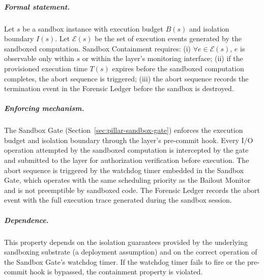 
\subparagraph{Formal statement.}  Let $s$ be a sandbox instance with execution
budget $B(s)$ and isolation boundary $I(s)$.  Let $\mathcal{E}(s)$ be the set of
execution events generated by the sandboxed computation.  Sandbox Containment
requires: (i) $\forall e \in \mathcal{E}(s)$, $e$ is observable only within $s$
or within the \fact{} layer's monitoring interface; (ii) if the provisioned
execution time $T(s)$ expires before the sandboxed computation completes, the
abort sequence is triggered; (iii) the abort sequence records the termination
event in the Forensic Ledger before the sandbox is destroyed.

\subparagraph{Enforcing mechanism.}  The Sandbox Gate (Section~\ref{sec:pillar-sandbox-gate})
enforces the execution budget and isolation boundary through the \fact{} layer's
pre-commit hook.  Every I/O operation attempted by the sandboxed computation is
intercepted by the gate and submitted to the \fact{} layer for authorization
verification before execution.  The abort sequence is triggered by the watchdog
timer embedded in the Sandbox Gate, which operates with the same scheduling
priority as the Bailout Monitor and is not preemptible by sandboxed code.
The Forensic Ledger records the abort event with the full execution trace
generated during the sandbox session.

\subparagraph{Dependence.}  This property depends on the isolation guarantees
provided by the underlying sandboxing substrate (a deployment assumption) and
on the correct operation of the Sandbox Gate's watchdog timer.  If the watchdog
timer fails to fire or the pre-commit hook is bypassed, the containment
property is violated.
